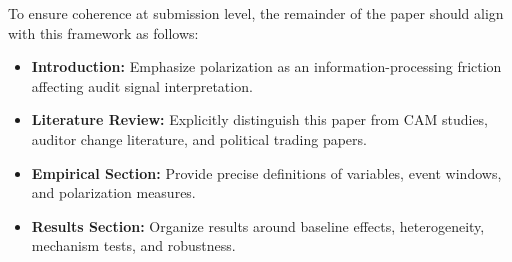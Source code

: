 To ensure coherence at submission level, the remainder of the paper should align with this framework as follows:

\begin{itemize}
    \item \textbf{Introduction:} Emphasize polarization as an information-processing friction affecting audit signal interpretation.
    \item \textbf{Literature Review:} Explicitly distinguish this paper from CAM studies, auditor change literature, and political trading papers.
    \item \textbf{Empirical Section:} Provide precise definitions of variables, event windows, and polarization measures.
    \item \textbf{Results Section:} Organize results around baseline effects, heterogeneity, mechanism tests, and robustness.
\end{itemize}